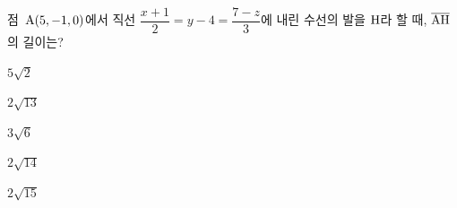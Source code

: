 점~$\mathrm{A}(5{,}\mkern3mu\mathopen{}-1{,}\mkern3mu\mathopen{}0)$에서 직선 $\dfrac{x+1}{2}=y-4=\dfrac{7-z}{3}$에 내린 수선의 발을 $\mathrm{H}$라 할 때, $\overline{\mathrm{AH}}$의 길이는?
\begin{choices32}{\rule[-3ex]{0pt}{8ex}$5\sqrt{2}$}{\rule[-3ex]{0pt}{8ex}$2\sqrt{13}$}{\rule[-3ex]{0pt}{8ex}$3\sqrt{6}$}{\rule[-3ex]{0pt}{8ex}$2\sqrt{14}$}{\rule[-3ex]{0pt}{8ex}$2\sqrt{15}$}\end{choices32}
